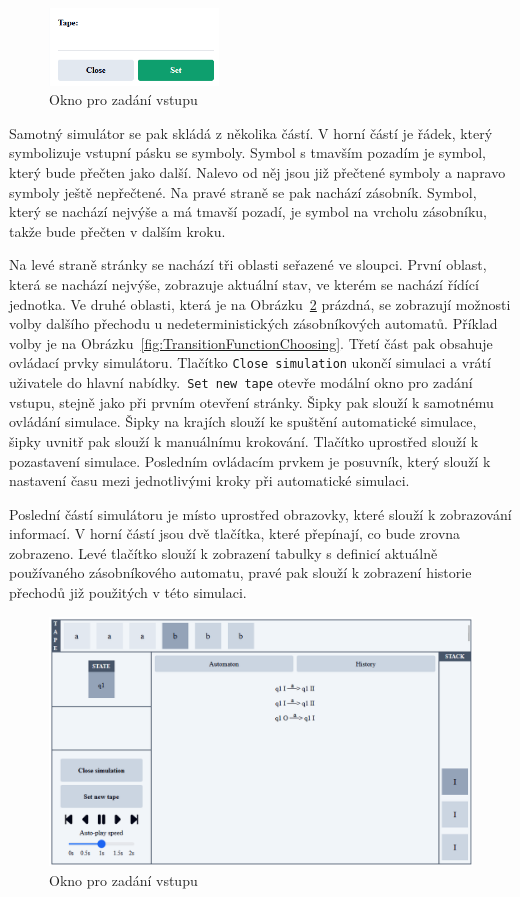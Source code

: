 \begin{figure}[h]
    \centering
    \includegraphics[width=0.4\textwidth]{Figures/PrntScrn_UI_TapeInput.png}
    \caption{Okno pro zadání vstupu}\label{fig:TapeInput}
\end{figure}

Samotný simulátor se pak skládá z několika částí. V horní částí je řádek, který symbolizuje vstupní pásku se symboly. Symbol s tmavším pozadím je symbol, který bude přečten jako další. Nalevo od něj jsou již přečtené symboly a napravo symboly ještě nepřečtené. Na pravé straně se pak nachází zásobník. Symbol, který se nachází nejvýše a má tmavší pozadí, je symbol na vrcholu zásobníku, takže bude přečten v dalším kroku. 

Na levé straně stránky se nachází tři oblasti seřazené ve sloupci. První oblast, která se nachází nejvýše, zobrazuje aktuální stav, ve kterém se nachází řídící jednotka. Ve druhé oblasti, která je na Obrázku~\ref{fig:Simulator} prázdná, se zobrazují možnosti volby dalšího přechodu u nedeterministických zásobníkových automatů. Příklad volby je na Obrázku~\ref{fig:TransitionFunctionChoosing}. Třetí část pak obsahuje ovládací prvky simulátoru. Tlačítko \texttt{Close simulation} ukončí simulaci a vrátí uživatele do hlavní nabídky.\ \texttt{Set new tape} otevře modální okno pro zadání vstupu, stejně jako při prvním otevření stránky.
Šipky pak slouží k samotnému ovládání simulace. Šipky na krajích slouží ke spuštění automatické simulace, šipky uvnitř pak slouží k manuálnímu krokování. Tlačítko uprostřed slouží k pozastavení simulace. Posledním ovládacím prvkem je posuvník, který slouží k nastavení času mezi jednotlivými kroky při automatické simulaci.

Poslední částí simulátoru je místo uprostřed obrazovky, které slouží k zobrazování informací. V horní částí jsou dvě tlačítka, které přepínají, co bude zrovna zobrazeno. Levé tlačítko slouží k zobrazení tabulky s definicí aktuálně používaného zásobníkového automatu, pravé pak slouží k zobrazení historie přechodů již použitých v této simulaci.

\begin{figure}[h]
    \centering
    \includegraphics[width=\textwidth]{Figures/PrntScrn_UI_Simulator.png}
    \caption{Okno pro zadání vstupu}\label{fig:Simulator}
\end{figure}

\endinput